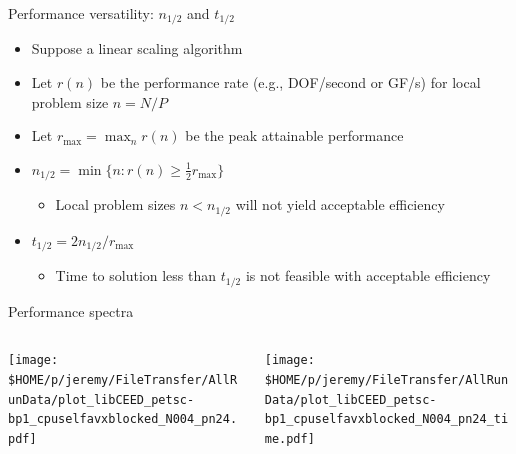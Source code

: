 \documentclass[aspectratio=1610]{beamer}
\begin{document}
\begin{frame}{Performance versatility: $n_{1/2}$ and $t_{1/2}$}
  \begin{itemize}
  \item Suppose a linear scaling algorithm
  \item Let $r(n)$ be the performance rate (e.g., DOF/second or GF/s) for local problem size $n = N/P$
  \item Let $r_{\max} = \max_n r(n)$ be the peak attainable performance
  \item $ n_{1/2} = \min \{ n : r(n) \ge \frac 1 2 r_{\max} \} $
    \begin{itemize}
    \item Local problem sizes $n < n_{1/2}$ will not yield acceptable efficiency
    \end{itemize}
  \item $ t_{1/2} = 2 n_{1/2} / r_{\max} $
    \begin{itemize}
    \item Time to solution less than $t_{1/2}$ is not feasible with acceptable efficiency
    \end{itemize}
  \end{itemize}
\end{frame}

\begin{frame}{Performance spectra}
  \begin{columns}
    \begin{column}{0.5\textwidth}
      \texttt{[image: \$HOME/p/jeremy/FileTransfer/AllRunData/plot\_libCEED\_petsc-bp1\_cpuselfavxblocked\_N004\_pn24.pdf]}
    \end{column}
    \begin{column}{0.5\textwidth}
      \texttt{[image: \$HOME/p/jeremy/FileTransfer/AllRunData/plot\_libCEED\_petsc-bp1\_cpuselfavxblocked\_N004\_pn24\_time.pdf]}
    \end{column}
  \end{columns}
\end{frame}
\end{document}
